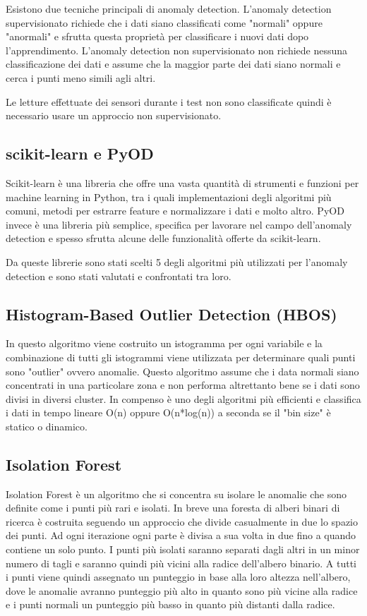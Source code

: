 Esistono due tecniche principali di anomaly detection. L'anomaly detection supervisionato richiede che i dati siano classificati come "normali" oppure "anormali" e sfrutta questa proprietà per classificare i nuovi dati dopo l'apprendimento. L'anomaly detection non supervisionato non richiede nessuna classificazione dei dati e assume che la maggior parte dei dati siano normali e cerca i punti  meno simili agli altri.

Le letture effettuate dei sensori durante i test non sono classificate quindi è necessario usare un approccio non supervisionato. 

\subsection{scikit-learn e PyOD}
Scikit-learn è una libreria che offre una vasta quantità di strumenti e funzioni per machine learning in Python, tra i quali implementazioni degli algoritmi più comuni, metodi per estrarre feature e normalizzare i dati e molto altro.
PyOD invece è una libreria più semplice, specifica per lavorare nel campo dell'anomaly detection e spesso sfrutta alcune delle funzionalità offerte da scikit-learn.

Da queste librerie sono stati scelti 5 degli algoritmi più utilizzati per l'anomaly detection e sono stati valutati e confrontati tra loro.

\subsection{Histogram-Based Outlier Detection (HBOS)}
In questo algoritmo viene costruito un istogramma per ogni variabile e la combinazione di tutti gli istogrammi viene utilizzata per determinare quali punti sono "outlier" ovvero anomalie. Questo algoritmo assume che i data normali siano concentrati in una particolare zona e non performa altrettanto bene se i dati sono divisi in diversi cluster. In compenso è uno degli algoritmi più efficienti e classifica i dati in tempo lineare O(n) oppure O(n*log(n)) a seconda se il "bin size" è statico o dinamico.

\subsection{Isolation Forest}
Isolation Forest è un algoritmo che si concentra su isolare le anomalie che sono definite come i punti più rari e isolati. In breve una foresta di alberi binari di ricerca è costruita seguendo un approccio che divide casualmente in due lo spazio dei punti. Ad ogni iterazione ogni parte è divisa a sua volta in due fino a quando contiene un solo punto. I punti più isolati saranno separati dagli altri in un minor numero di tagli e saranno quindi più vicini alla radice dell'albero binario. A tutti i punti viene quindi assegnato un punteggio in base alla loro altezza nell'albero, dove le anomalie avranno punteggio più alto in quanto sono più vicine alla radice e i punti normali un punteggio più basso in quanto più distanti dalla radice.


